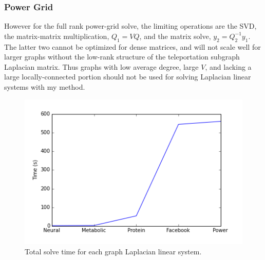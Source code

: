 \documentclass{article}
\begin{document}
\subsubsection{Power Grid}
However for the full rank power-grid solve, the limiting operations are the SVD, the matrix-matrix multiplication, $Q_1 = VQ$, and the matrix solve, $y_2 = Q_2^{-1}y_1$. The latter two cannot be optimized for dense matrices, and will not scale well for larger graphs without the low-rank structure of the teleportation subgraph Laplacian matrix. Thus graphs with low average degree, large $V$, and lacking a large locally-connected portion should not be used for solving Laplacian linear systems with my method.

\begin{figure}[H]
\centering
\includegraphics[width = \linewidth]{total.png}
\caption{Total solve time for each graph Laplacian linear system.}
\end{figure}

%
%
\end{document}
